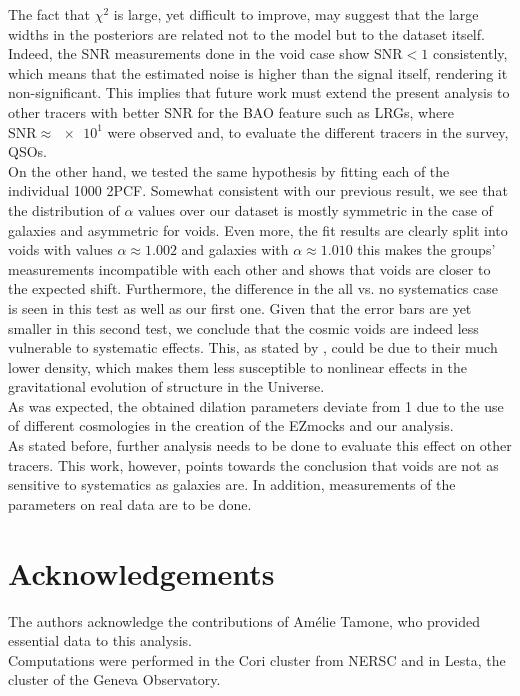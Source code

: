 \documentclass[fleqn, usenatbib]{mnras}
\begin{document}
The fact that $\chi^2$ is large, yet difficult to improve, may suggest that the large widths in the posteriors are related not to the model but to the dataset itself. Indeed, the SNR measurements done in the void case show $\mathrm{SNR}<1$ consistently, which means that the estimated noise is higher than the signal itself, rendering it non-significant. This implies that future work must extend the present analysis to other tracers with better SNR for the BAO feature such as LRGs, where $\mathrm{SNR}\approx\num{e1}$ were observed \citep[see][]{Liang2016} and, to evaluate the different tracers in the survey, QSOs.\\
On the other hand, we tested the same hypothesis by fitting each of the individual 1000 2PCF. Somewhat consistent with our previous result, we see that the distribution of $\alpha$ values over our dataset is mostly symmetric in the case of galaxies and asymmetric for voids. Even more, the fit results are clearly split into voids with values $\alpha\approx1.002$ and galaxies with $\alpha\approx1.010$ this makes the groups' measurements incompatible with each other and shows that voids are closer to the expected shift. Furthermore, the difference in the all vs. no systematics case is seen in this test as well as our first one. Given that the error bars are yet smaller in this second test, we conclude that the cosmic voids are indeed less vulnerable to systematic effects. This, as stated by \citet{Zhao2019}, could be due to their much lower density, which makes them less susceptible to nonlinear effects in the gravitational evolution of structure in the Universe.\\
As was expected, the obtained dilation parameters deviate from 1 due to the use of different cosmologies in the creation of the EZmocks and our analysis.\\
As stated before, further analysis needs to be done to evaluate this effect on other tracers. This work, however, points towards the conclusion that voids are not as sensitive to systematics as galaxies are. In addition, measurements of the parameters on real data are to be done.

\section*{Acknowledgements}
The authors acknowledge the contributions of Am\'elie Tamone, who provided essential data to this analysis.\\
Computations were performed in the Cori cluster from NERSC and in Lesta, the cluster of the Geneva Observatory.
\end{document}
